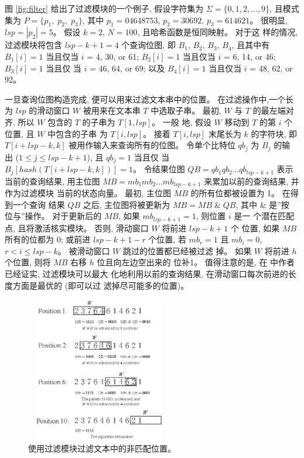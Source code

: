 图 \ref{fig:filter} 给出了过滤模块的一个例子, 假设字符集为
$\Sigma = \{0, 1, 2, \dots, 9\}$, 且模式集为 $P = \{p_1,\; p_2,\;
p_3\}$, 其中 $p_1 = 04648753$, $p_2 = 30692$, $p_3 = 614621$。 很明显,
$lsp = |p_2|= 5$。 假设 $k = 2$, $N = 100$, 且哈希函数是恒同映射。 对于这
样的情况, 过滤模块将包含 $lsp - k + 1 = 4$ 个查询位图, 即 $B_1$,
$B_2$, $B_3$, $B_4$, 且其中有 $B_1[i] = 1$ 当且仅当 $i$ = 4, 30, or
61; $B_2[i] = 1$ 当且仅当 $i$ = 6, 14, or 46; $B_3[i] = 1$ 当且仅
当 $i$ = 46, 64, or 69; 以及 $B_4[i] = 1$ 当且仅当 $i$ = 48, 62, or
92。

一旦查询位图构造完成, 便可以用来过滤文本串中的位置。 在过滤操作中,一个长
为 $lsp$ 的滑动窗口 $W$ 被用来在文本串 $T$ 中选取子串。 最初,
$W$ 与 $T$ 的最左端对齐, 所以 $W$ 包含的 $T$ 的子串为 $T[1,lsp]$。 一般
地, 假设 $W$ 移动到 $T$ 的第 $i$ 个位置, 且 $W$ 中包含的子串
为 $T[i,lsp]$。 接着 $T[i,lsp]$ 末尾长为 $k$ 的字符块, 即 $T[i+lsp-k,
k]$ 被用作输入来查询所有的位图。 令单个比特位 $qb_j$ 为 $B_j$ 的输
出 ($1 \leq j \leq lsp - k + 1$), 且 $qb_j=1$ 当且仅
当 $B_j[hash(T[i+lsp-k,k])] = 1$。 令结果位图
$QB = qb_1qb_2 \dots qb_{lsp-k+1}$ 表示当前的查询结果, 用主位图
$MB = mb_1mb_2 \dots mb_{lsp-k+1}$ 来累加以前的查询结果, 并作为过滤模块
当前的状态向量。 最初, 主位图 $MB$ 的所有位都被设置为 1。 在得到一个查询
结果 $QB$ 之后, 主位图将被更新为 $MB = MB \; \& \; QB$, 其中 \& 是''按
位与''操作。 对于更新后的 $MB$, 如果 $mb_{lsp-k+1} = 1$, 则位置 $i$ 是一
个潜在匹配点, 且将激活核实模块。 否则, 滑动窗口 $W$ 将前进 $lsp-k+1$ 个
位置, 如果 $MB$ 所有的位都为 0; 或前进 $lsp-k+1-r$ 个位置, 若 $mb_r=1$
且 $mb_i=0$, $r < i \leq lsp-k$。 被滑动窗口 $W$ 跳过的位置都已经被过滤
掉。  如果 $W$ 将前进 $h$ 个位置, 则将 $MB$ 右移 $h$ 位且向左边空出来的
位补1。 值得注意的是, 在 \cite{Lee2013} 中作者已经证实, 过滤模块可以最大
化地利用以前的查询结果, 在滑动窗口每次前进的长度方面是最优的 (即可以过
滤掉尽可能多的位置)。

\begin{figure}[!h]
  \centering
  \includegraphics[height=2.5in, width=2.5in]{figures/2_MPM/filter_match}
  \caption{使用过滤模块过滤文本中的非匹配位置。}
  \label{fig:f_match}
\end{figure}

